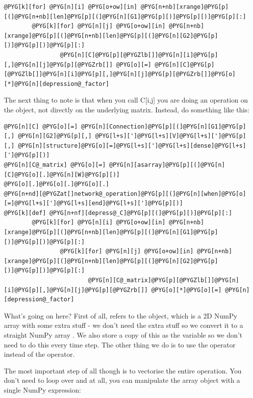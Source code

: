 \documentclass[letterpaper,10pt,english]{manual}
\begin{document}
\begin{Verbatim}[commandchars=@\[\]]
@PYG[k][for] @PYG[n][i] @PYG[o+ow][in] @PYG[n+nb][xrange]@PYG[p][(]@PYG[n+nb][len]@PYG[p][(]@PYG[n][G1]@PYG[p][)]@PYG[p][)]@PYG[p][:]
        @PYG[k][for] @PYG[n][j] @PYG[o+ow][in] @PYG[n+nb][xrange]@PYG[p][(]@PYG[n+nb][len]@PYG[p][(]@PYG[n][G2]@PYG[p][)]@PYG[p][)]@PYG[p][:]
                @PYG[n][C]@PYG[p][@PYGZlb[]]@PYG[n][i]@PYG[p][,]@PYG[n][j]@PYG[p][@PYGZrb[]] @PYG[o][=] @PYG[n][C]@PYG[p][@PYGZlb[]]@PYG[n][i]@PYG[p][,]@PYG[n][j]@PYG[p][@PYGZrb[]]@PYG[o][*]@PYG[n][depression@_factor]
\end{Verbatim}

The next thing to note is that when you call C{[}i,j{]} you are doing an
operation on the \hyperlink{brian.Connection}{} object, not directly on the underlying
matrix. Instead, do something like this:

\begin{Verbatim}[commandchars=@\[\]]
@PYG[n][C] @PYG[o][=] @PYG[n][Connection]@PYG[p][(]@PYG[n][G1]@PYG[p][,] @PYG[n][G2]@PYG[p][,] @PYG[l+s][']@PYG[l+s][V]@PYG[l+s][']@PYG[p][,] @PYG[n][structure]@PYG[o][=]@PYG[l+s][']@PYG[l+s][dense]@PYG[l+s][']@PYG[p][)]
@PYG[n][C@_matrix] @PYG[o][=] @PYG[n][asarray]@PYG[p][(]@PYG[n][C]@PYG[o][.]@PYG[n][W]@PYG[p][)]
@PYG[o][.]@PYG[o][.]@PYG[o][.]
@PYG[n+nd][@PYGZat[]network@_operation]@PYG[p][(]@PYG[n][when]@PYG[o][=]@PYG[l+s][']@PYG[l+s][end]@PYG[l+s][']@PYG[p][)]
@PYG[k][def] @PYG[n+nf][depress@_C]@PYG[p][(]@PYG[p][)]@PYG[p][:]
        @PYG[k][for] @PYG[n][i] @PYG[o+ow][in] @PYG[n+nb][xrange]@PYG[p][(]@PYG[n+nb][len]@PYG[p][(]@PYG[n][G1]@PYG[p][)]@PYG[p][)]@PYG[p][:]
                @PYG[k][for] @PYG[n][j] @PYG[o+ow][in] @PYG[n+nb][xrange]@PYG[p][(]@PYG[n+nb][len]@PYG[p][(]@PYG[n][G2]@PYG[p][)]@PYG[p][)]@PYG[p][:]
                        @PYG[n][C@_matrix]@PYG[p][@PYGZlb[]]@PYG[n][i]@PYG[p][,]@PYG[n][j]@PYG[p][@PYGZrb[]] @PYG[o][*]@PYG[o][=] @PYG[n][depression@_factor]
\end{Verbatim}

What's going on here? First of all,  refers to the \hyperlink{brian.ConnectionMatrix}{}
object, which is a 2D NumPy array with some extra stuff - we don't need the extra
stuff so we convert it to a straight NumPy array . We also store
a copy of this as the variable  so we don't need to do this every
time step. The other thing we do is to use the \code{*=} operator instead of the \code{*}
operator.

The most important step of all though is to vectorise the entire operation. You
don't need to loop over  and  at all, you can manipulate the array
object with a single NumPy expression:
\end{document}
